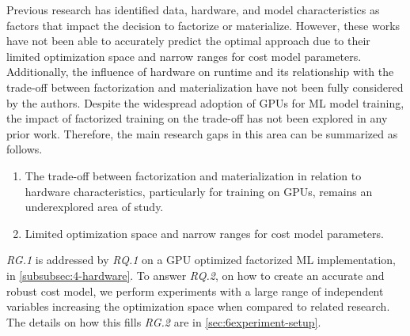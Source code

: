 Previous research has identified data, hardware, and model characteristics as factors that impact the decision to factorize or materialize. However, these works have not been able to accurately predict the optimal approach due to their limited optimization space and narrow ranges for cost model parameters. Additionally, the influence of hardware on runtime and its relationship with the trade-off between factorization and materialization have not been fully considered by the authors. Despite the widespread adoption of GPUs for ML model training, the impact of factorized training on the trade-off has not been explored in any prior work. Therefore, the main research gaps in this area can be summarized as follows.
\begin{enumerate}[leftmargin=1.5cm, label=\emph{RG.\arabic*}]
  \item The trade-off between factorization and materialization in relation to hardware characteristics, particularly for training on GPUs, remains an underexplored area of study.
  \item Limited optimization space and narrow ranges for cost model parameters.
\end{enumerate}
\emph{RG.1} is addressed by \emph{RQ.1} on a GPU optimized factorized ML implementation, in \autoref{subsubsec:4-hardware}. To answer \emph{RQ.2}, on how to create an accurate and robust cost model, we perform experiments with a large range of independent variables increasing the optimization space when compared to related research. The details on how this fills \emph{RG.2} are in \autoref{sec:6experiment-setup}.